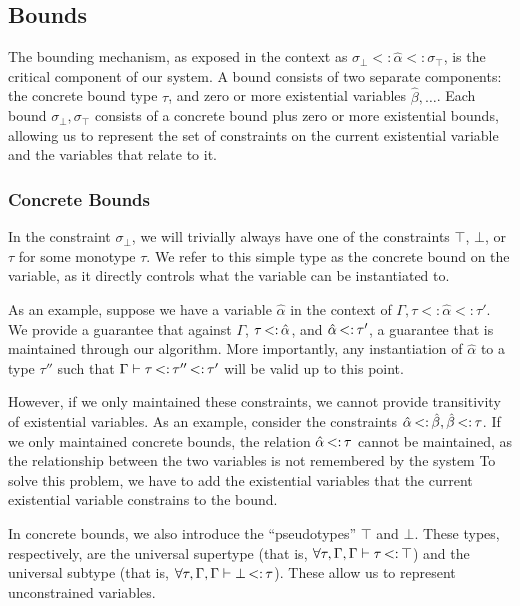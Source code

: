 \documentclass{sig-alternate}
\newcommand{\st}{\ensuremath{\hspace{-1px}<:\hspace{-1px}}}
\newcommand{\alphahat}{\hat{\alpha}}
\newcommand{\botbound}{\sigma_\bot}
\newcommand{\topbound}{\sigma_\top}
\newcommand{\tst}{{\scriptstyle{<:}}}
\newcommand{\bound}[3]{#1 \tst #2 \tst #3}
\begin{document}
\subsection{Bounds}
The bounding mechanism, as exposed in the context as $\bound{\botbound}{\hat{\alpha}}{\topbound}$, is the critical component of our system. A bound consists of two separate components: the concrete bound type $\tau$, and zero or more existential variables $\hat{\beta}, \ldots$. Each bound $\botbound,\topbound$ consists of a concrete bound plus zero or more existential bounds, allowing us to represent the set of constraints on the current existential variable and the variables that relate to it.


\subsubsection{Concrete Bounds}
In the constraint $\botbound$, we will trivially always have one of the constraints $\top$, $\bot$, or $\tau$ for some monotype $\tau$. We refer to this simple type as the concrete bound on the variable, as it directly controls what the variable can be instantiated to.

As an example, suppose we have a variable $\hat{\alpha}$ in the context of $\Gamma, \bound{\tau}{\hat{\alpha}}{\tau'}$. We provide a guarantee that against $\Gamma$, $\tau \st \hat{\alpha}$, and $\hat{\alpha} \st \tau'$, a guarantee that is maintained through our algorithm. More importantly, any instantiation of $\alphahat$ to a type $\tau''$ such that $\Gamma \vdash \tau \st \tau'' \st \tau'$ will be valid up to this point.

However, if we only maintained these constraints, we cannot provide transitivity of existential variables. As an example, consider the constraints $\hat{\alpha} \st \hat{\beta}, \hat{\beta} \st \tau$. If we only maintained concrete bounds, the relation $\hat{\alpha} \st \tau$ cannot be maintained, as the relationship between the two variables is not remembered by the system To solve this problem, we have to add the existential variables that the current existential variable constrains to the bound.

In concrete bounds, we also introduce the ``pseudotypes'' $\top$ and $\bot$. These types, respectively, are the universal supertype (that is, $\forall\tau,\Gamma, \Gamma \vdash \tau \st \top$) and the universal subtype (that is, $\forall\tau,\Gamma, \Gamma \vdash \bot \st \tau$). These allow us to represent unconstrained variables.
\end{document}
